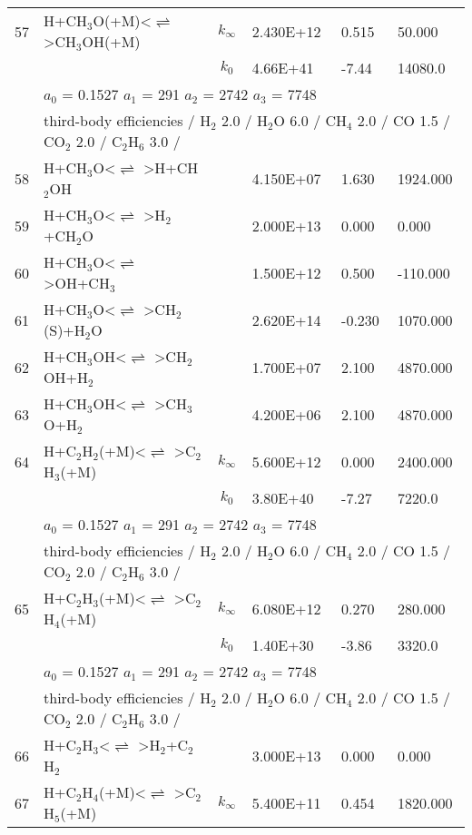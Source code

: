 \documentclass[11pt]{article}
\begin{document}
\begin{table}[hbt]
\begin{tabular}{|r l c l l l|}
57 &	H+CH$_{3}$O(+M)<$\rightleftharpoons$ >CH$_{3}$OH(+M)&	$k_{\infty}$&	2.430E+12&	0.515&	50.000\\ 
	&	&	$k_0$&	4.66E+41&-7.44&	14080.0\\ 
	&\multicolumn{5}{l|}{	$a_0$ = 0.1527	$a_1$ = 291	$a_2$ = 2742	$a_3$ = 7748}\\ 
	&\multicolumn{5}{l|}{third-body efficiencies  / H$_{2}$ 2.0 / H$_{2}$O 6.0 / CH$_{4}$ 2.0 / CO 1.5 / CO$_{2}$ 2.0 / C$_{2}$H$_{6}$ 3.0 /}\\ 
58 &	H+CH$_{3}$O<$\rightleftharpoons$ >H+CH$_{2}$OH&	&	4.150E+07&	1.630&	1924.000\\ 
59 &	H+CH$_{3}$O<$\rightleftharpoons$ >H$_{2}$+CH$_{2}$O&	&	2.000E+13&	0.000&	0.000\\ 
60 &	H+CH$_{3}$O<$\rightleftharpoons$ >OH+CH$_{3}$&	&	1.500E+12&	0.500&	-110.000\\ 
61 &	H+CH$_{3}$O<$\rightleftharpoons$ >CH$_{2}$(S)+H$_{2}$O&	&	2.620E+14&	-0.230&	1070.000\\ 
62 &	H+CH$_{3}$OH<$\rightleftharpoons$ >CH$_{2}$OH+H$_{2}$&	&	1.700E+07&	2.100&	4870.000\\ 
63 &	H+CH$_{3}$OH<$\rightleftharpoons$ >CH$_{3}$O+H$_{2}$&	&	4.200E+06&	2.100&	4870.000\\ 
64 &	H+C$_{2}$H$_{2}$(+M)<$\rightleftharpoons$ >C$_{2}$H$_{3}$(+M)&	$k_{\infty}$&	5.600E+12&	0.000&	2400.000\\ 
	&	&	$k_0$&	3.80E+40&-7.27&	 7220.0\\ 
	&\multicolumn{5}{l|}{	$a_0$ = 0.1527	$a_1$ = 291	$a_2$ = 2742	$a_3$ = 7748}\\ 
	&\multicolumn{5}{l|}{third-body efficiencies  / H$_{2}$ 2.0 / H$_{2}$O 6.0 / CH$_{4}$ 2.0 / CO 1.5 / CO$_{2}$ 2.0 / C$_{2}$H$_{6}$ 3.0 /}\\ 
65 &	H+C$_{2}$H$_{3}$(+M)<$\rightleftharpoons$ >C$_{2}$H$_{4}$(+M)&	$k_{\infty}$&	6.080E+12&	0.270&	280.000\\ 
	&	&	$k_0$&	1.40E+30&-3.86&	 3320.0\\ 
	&\multicolumn{5}{l|}{	$a_0$ = 0.1527	$a_1$ = 291	$a_2$ = 2742	$a_3$ = 7748}\\ 
	&\multicolumn{5}{l|}{third-body efficiencies  / H$_{2}$ 2.0 / H$_{2}$O 6.0 / CH$_{4}$ 2.0 / CO 1.5 / CO$_{2}$ 2.0 / C$_{2}$H$_{6}$ 3.0 /}\\ 
66 &	H+C$_{2}$H$_{3}$<$\rightleftharpoons$ >H$_{2}$+C$_{2}$H$_{2}$&	&	3.000E+13&	0.000&	0.000\\ 
67 &	H+C$_{2}$H$_{4}$(+M)<$\rightleftharpoons$ >C$_{2}$H$_{5}$(+M)&	$k_{\infty}$&	5.400E+11&	0.454&	1820.000\\ 

\end{tabular}
\end{table}
\end{document}
